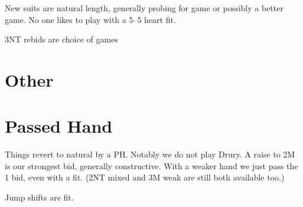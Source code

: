 \documentclass[main]{subfile}
\begin{document}
{	New suits are natural length, generally probing for game or possibly a better game.  No one likes to play  with a 5--5 heart fit.
	
	3NT rebids are choice of games
	 
\section {Other}	

	
\section{Passed Hand}

Things revert to natural by a PH.  Notably we do not play Drury.  A raise to 2M is our strongest bid, generally constructive.  With a weaker hand we just pass the 1 bid, even with a fit.  (2NT mixed and 3M weak are still both available too.)

Jump shifts are fit.

} %
	  
\end{document}
